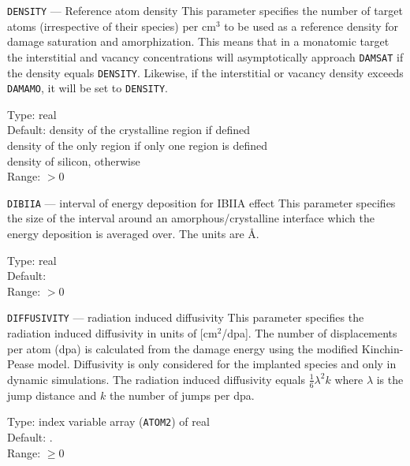 \begin{keydescription}{\texttt{DENSITY} --- Reference atom density}
%
  This parameter specifies the number of target atoms (irrespective of
  their species) per cm$^3$ to be used as a reference density for damage
  saturation and amorphization.  This means that in a monatomic target the
  interstitial and vacancy concentrations will asymptotically approach
  \texttt{DAMSAT} if the density equals \texttt{DENSITY}.  Likewise, if the
  interstitial or vacancy density exceeds \texttt{DAMAMO}, it will be set to
  \texttt{DENSITY}.
  \begin{keytab}
    Type:    \> real \\
    Default: \> density of the crystalline region if defined \\ 
             \> density of the only region if only one region is defined \\
             \> density of silicon, otherwise \\
    Range:   \> $> 0$
  \end{keytab}
\end{keydescription}

\begin{keydescription}{\texttt{DIBIIA} --- interval of energy
    deposition for IBIIA effect}
%
  This parameter specifies the size of the interval around an
  amorphous/crystalline interface which the energy deposition is
  averaged over. The units are \AA.
  \begin{keytab}
    Type:    \> real \\
    Default:  \\
    Range:   \> $> 0$ 
  \end{keytab}
\end{keydescription}

\begin{keydescription}{\texttt{DIFFUSIVITY} --- radiation induced diffusivity}
%
  This parameter specifies the radiation induced diffusivity in units of 
  [cm$^2$/dpa]. The number of displacements per atom (dpa) is calculated from 
  the damage energy using the modified Kinchin-Pease model. Diffusivity is 
  only considered for the implanted species and only in dynamic simulations. 
  The radiation induced diffusivity equals $\frac{1}{6}\lambda^2 k$ 
  where $\lambda$ is the jump distance and $k$ the number of jumps per dpa.
  \begin{keytab}
    Type:    \> index variable array (\texttt{ATOM2}) of real \\
    Default: . \\
    Range:   \> $\ge 0$ 
  \end{keytab}
\end{keydescription}

